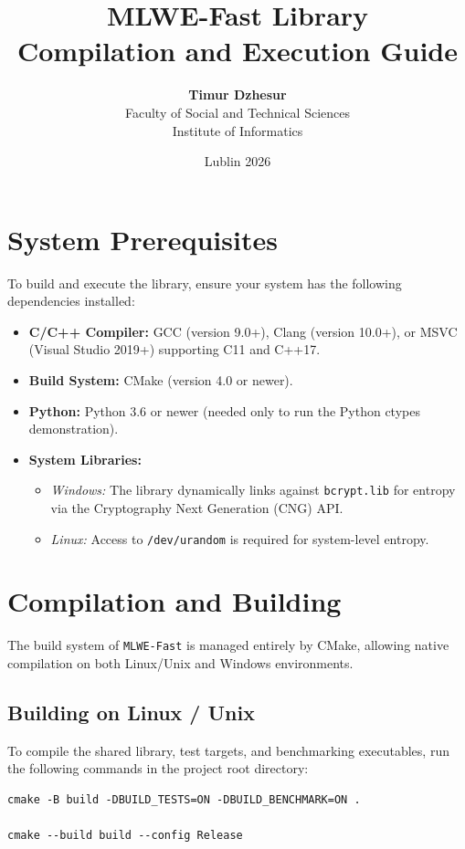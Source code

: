 \documentclass[12pt,a4paper]{article}
\title{\textbf{MLWE-Fast Library}\\ \large Compilation and Execution Guide}
\author{\textbf{Timur Dzhesur} \\ Faculty of Social and Technical Sciences \\ Institute of Informatics}
\date{Lublin 2026}
\begin{document}
\maketitle

\section{System Prerequisites}
To build and execute the library, ensure your system has the following dependencies installed:
\begin{itemize}
    \item \textbf{C/C++ Compiler:} GCC (version 9.0+), Clang (version 10.0+), or MSVC (Visual Studio 2019+) supporting C11 and C++17.
    \item \textbf{Build System:} CMake (version 4.0 or newer).
    \item \textbf{Python:} Python 3.6 or newer (needed only to run the Python ctypes demonstration).
    \item \textbf{System Libraries:}
    \begin{itemize}
        \item \textit{Windows:} The library dynamically links against \texttt{bcrypt.lib} for entropy via the Cryptography Next Generation (CNG) API.
        \item \textit{Linux:} Access to \texttt{/dev/urandom} is required for system-level entropy.
    \end{itemize}
\end{itemize}

\section{Compilation and Building}
The build system of \texttt{MLWE-Fast} is managed entirely by CMake, allowing native compilation on both Linux/Unix and Windows environments.

\subsection{Building on Linux / Unix}
To compile the shared library, test targets, and benchmarking executables, run the following commands in the project root directory:

\begin{lstlisting}
cmake -B build -DBUILD_TESTS=ON -DBUILD_BENCHMARK=ON .

cmake --build build --config Release
\end{lstlisting}
\end{document}
